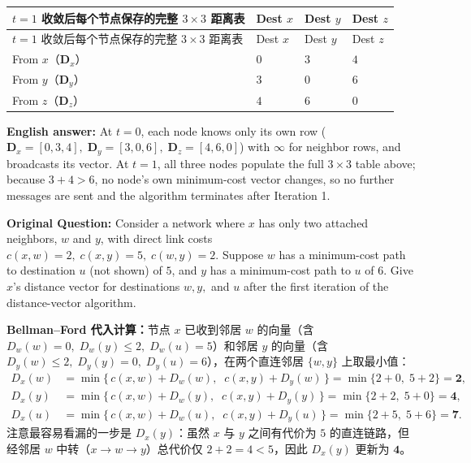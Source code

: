 \begingroup\small\setlength{\tabcolsep}{3pt}\renewcommand{\arraystretch}{1.18}
\begin{longtable}{@{}>{\raggedright\arraybackslash}p{}>{\raggedright\arraybackslash}p{}>{\raggedright\arraybackslash}p{}>{\raggedright\arraybackslash}p{}@{}}
\toprule
$t=1$ 收敛后每个节点保存的完整 $3\times 3$ 距离表 & Dest $x$ & Dest $y$ & Dest $z$ \\
\midrule\endfirsthead
$t=1$ 收敛后每个节点保存的完整 $3\times 3$ 距离表 & Dest $x$ & Dest $y$ & Dest $z$ \\
\midrule\endhead
\bottomrule\endfoot
From $x$（$\mathbf{D}_x$） & $0$ & $3$ & $4$ \\
From $y$（$\mathbf{D}_y$） & $3$ & $0$ & $6$ \\
From $z$（$\mathbf{D}_z$） & $4$ & $6$ & $0$ \\
\end{longtable}\endgroup

\textbf{English answer:} At $t=0$, each node knows only its own row ($\mathbf{D}_x=[0,3,4],\; \mathbf{D}_y=[3,0,6],\; \mathbf{D}_z=[4,6,0]$) with $\infty$ for neighbor rows, and broadcasts its vector. At $t=1$, all three nodes populate the full $3\times 3$ table above; because $3+4 > 6$, no node's own minimum-cost vector changes, so no further messages are sent and the algorithm terminates after Iteration 1.



\textbf{Original Question:} Consider a network where $x$ has only two attached neighbors, $w$ and $y$, with direct link costs $c(x,w)=2,\; c(x,y)=5,\; c(w,y)=2$. Suppose $w$ has a minimum-cost path to destination $u$ (not shown) of $5$, and $y$ has a minimum-cost path to $u$ of $6$. Give $x$'s distance vector for destinations $w, y,$ and $u$ after the first iteration of the distance-vector algorithm.

\textbf{Bellman–Ford 代入计算：}节点 $x$ 已收到邻居 $w$ 的向量（含 $D_w(w)=0,\; D_w(y)\le 2,\; D_w(u)=5$）和邻居 $y$ 的向量（含 $D_y(w)\le 2,\; D_y(y)=0,\; D_y(u)=6$），在两个直连邻居 $\{w, y\}$ 上取最小值：
\begin{align*}
D_x(w) &= \min\bigl\{\,c(x,w) + D_w(w),\;\; c(x,y) + D_y(w)\,\bigr\} = \min\{2+0,\; 5+2\} = \mathbf{2}, \\
D_x(y) &= \min\bigl\{\,c(x,w) + D_w(y),\;\; c(x,y) + D_y(y)\,\bigr\} = \min\{2+2,\; 5+0\} = \mathbf{4}, \\
D_x(u) &= \min\bigl\{\,c(x,w) + D_w(u),\;\; c(x,y) + D_y(u)\,\bigr\} = \min\{2+5,\; 5+6\} = \mathbf{7}.
\tag{T9.2}
\end{align*}
注意最容易看漏的一步是 $D_x(y)$：虽然 $x$ 与 $y$ 之间有代价为 $5$ 的直连链路，但经邻居 $w$ 中转（$x \to w \to y$）总代价仅 $2 + 2 = 4 < 5$，因此 $D_x(y)$ 更新为 $\mathbf{4}$。

